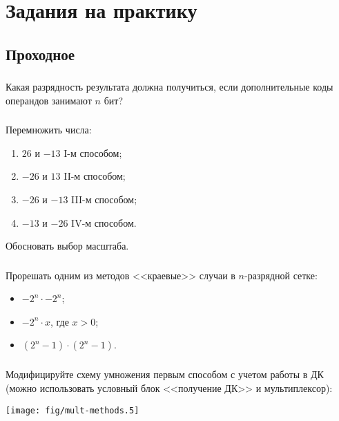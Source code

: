 \appendix


\section{Задания на практику}


\subsection{Проходное}

\begin{frame}
    \frametitle{\TaskSimpleNumber}
    Какая разрядность результата должна получиться, если дополнительные коды операндов занимают $n$ бит?
\end{frame}

\begin{frame}
    \frametitle{\TaskSimpleNumber}

    Перемножить числа:

    \begin{enumerate}
        \item $26$ и $-13$ I-м способом; 
        \item $-26$ и $13$ II-м способом; 
        \item $-26$ и $-13$ III-м способом; 
        \item $-13$ и $-26$ IV-м способом.
    \end{enumerate}
    
    Обосновать выбор масштаба.
\end{frame}

\begin{frame}
    \frametitle{\TaskSimpleNumber}
    Прорешать одним из методов <<краевые>> случаи в $n$-разрядной сетке:
    \begin{itemize}
        \item $-2^n\cdot -2^n$;
        \item $-2^n\cdot x$, где $x>0$;
        \item $(2^n-1)\cdot(2^n-1)$.
    \end{itemize}
\end{frame}

\begin{frame}
    \frametitle{\TaskSimpleNumber}
    
    Модифицируйте схему умножения первым способом с учетом работы в ДК (можно использовать условный блок <<получение ДК>> и мультиплексор):
    \begin{center}
        \texttt{[image: fig/mult-methods.5]}
    \end{center}
\end{frame}


